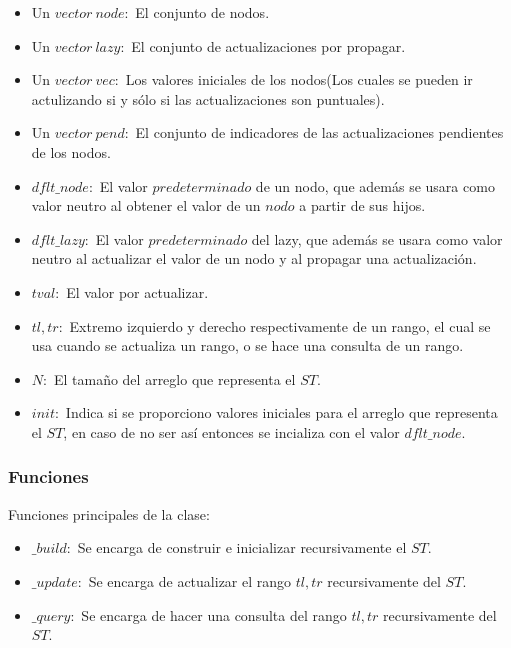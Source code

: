 \documentclass[letterpaper]{article}
\theoremstyle{definition}
\theoremstyle{lemathm}
\theoremstyle{lemathm}
\theoremstyle{lemathm}
\theoremstyle{lemademthm}
\newcommand{\1}{\mathbbm{1}}
\begin{document}
	\begin{itemize}
		\item Un $vector\ node:$ El conjunto de nodos.
		\item Un $vector\ lazy:$ El conjunto de actualizaciones por propagar.
		\item Un $vector\ vec:$ Los valores iniciales de los nodos(Los cuales se pueden ir actulizando si y sólo si las actualizaciones son puntuales).
		\item Un $vector\ pend:$ El conjunto de indicadores de las actualizaciones pendientes de los nodos.
		\item $dflt\_node:$ El valor $predeterminado$ de un nodo, que además se usara como valor neutro al obtener el valor de un $nodo$ a partir de sus hijos.
		\item $dflt\_lazy:$ El valor $predeterminado$ del lazy, que además se usara como valor neutro al actualizar el valor de un nodo y al propagar una actualización.
		\item $tval:$ El valor por actualizar.
		\item $tl, tr:$ Extremo izquierdo y derecho respectivamente de un rango, el cual se usa cuando se actualiza un rango, o se hace una consulta de un rango.
		\item $N:$ El tamaño del arreglo que representa el $ST$.
		\item $init:$ Indica si se proporciono valores iniciales para el arreglo que representa el $ST$, en caso de no ser así entonces se incializa con el valor $dflt\_node$.
	\end{itemize}

	\subsubsection*{Funciones}

	Funciones principales de la clase:

	\begin{itemize}
		\item $\_build:$ Se encarga de construir e inicializar recursivamente el $ST$.
		\item $\_update:$ Se encarga de actualizar el rango $tl,tr$ recursivamente del $ST$.
		\item $\_query:$ Se encarga de hacer una consulta del rango $tl,tr$ recursivamente del $ST$. 
	\end{itemize}
\end{document}
